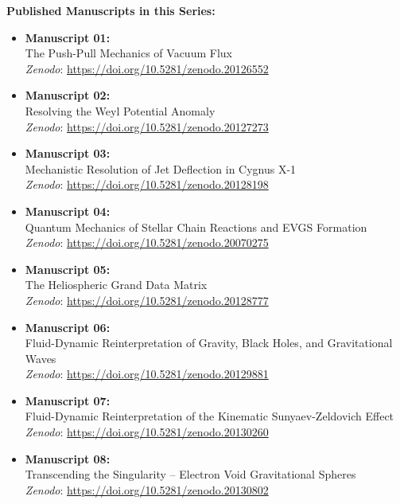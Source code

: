 \documentclass[11pt, a4paper]{article}
\begin{document}
  \vspace{1em}
  \noindent \textbf{Published Manuscripts in this Series:}
  \begin{itemize}
    \item \textbf{Manuscript 01:} \\ The Push-Pull Mechanics of Vacuum Flux \\ \textit{Zenodo}: \url{https://doi.org/10.5281/zenodo.20126552}
    
    \item \textbf{Manuscript 02:} \\ Resolving the Weyl Potential Anomaly \\ \textit{Zenodo}: \url{https://doi.org/10.5281/zenodo.20127273}

    \item \textbf{Manuscript 03:} \\ Mechanistic Resolution of Jet Deflection in Cygnus X-1 \\ \textit{Zenodo}: \url{https://doi.org/10.5281/zenodo.20128198}

    \item \textbf{Manuscript 04:} \\ Quantum Mechanics of Stellar Chain Reactions and EVGS Formation \\ \textit{Zenodo}: \url{https://doi.org/10.5281/zenodo.20070275}

    \item \textbf{Manuscript 05:} \\ The Heliospheric Grand Data Matrix \\ \textit{Zenodo}: \url{https://doi.org/10.5281/zenodo.20128777}

    \item \textbf{Manuscript 06:} \\ Fluid-Dynamic Reinterpretation of Gravity, Black Holes, and Gravitational Waves \\ \textit{Zenodo}: \url{https://doi.org/10.5281/zenodo.20129881}

    \item \textbf{Manuscript 07:} \\ Fluid-Dynamic Reinterpretation of the Kinematic Sunyaev-Zeldovich Effect \\ \textit{Zenodo}: \url{https://doi.org/10.5281/zenodo.20130260}

    \item \textbf{Manuscript 08:} \\ Transcending the Singularity -- Electron Void Gravitational Spheres \\ \textit{Zenodo}: \url{https://doi.org/10.5281/zenodo.20130802}


\end{itemize}
\end{document}
